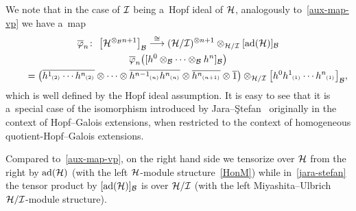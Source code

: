 \documentclass[pdftex]{sigma}
\numberwithin{equation}{section}
\DeclareMathOperator{\ad}{ad}
\newcommand{\ps}[1]{~\hspace{-4pt}_{^{(#1)}}}
\newcommand{\wbar}[1]{\overline{#1}}
\begin{document}
We note that in the case of ${\cal I}$ being a~Hopf ideal of ${\cal H}$, analogously to~\eqref{aux-map-vp} we have a~map
\begin{gather}
\label{jara-stefan}
\overline{\varphi}_n\colon \ \big[{\cal H}^{\otimes_{\cal B} n+1}\big]_{{\cal B}} \stackrel{\cong}{\longrightarrow} ({\cal
H}/{\cal I})^{\otimes n+1} \otimes_{{\cal H}/{\cal I}} [\ad({\cal H})]_{{\cal B}}
\\
\overline{\varphi}_n\big([h^0\otimes_{\cal B}\cdots\otimes_{\cal B} h^n]_{\cal B} \big)\nonumber
\\
\qquad
=\big(\wbar{h^1\ps{2}\cdots h^n\ps{2}} \otimes\cdots\otimes \wbar{h^{n-1}\ps{n}h^n\ps{n}} \otimes
\wbar{h^n\ps{n+1}} \otimes \wbar{1}\big) \otimes_{{\cal H}/{\cal I}} \big[h^0h^1\ps{1}\cdots h^n\ps{1}\big]_{{\cal B}},\nonumber
\end{gather}
which is well def\/ined by the Hopf ideal assumption.
It is easy to see that it is a~special case of the isomorphism introduced by Jara--\c{S}tefan~\cite[Theorem~3.7]{JaraStef06}
originally in the context of Hopf--Galois extensions, when restricted to the context of homogeneous
quotient-Hopf--Galois extensions.

Compared to~\eqref{aux-map-vp}, on the right hand side we tensorize over ${\cal H}$ from the right by $\ad({\cal H})$
(with the left ${\cal H}$-module structure~\eqref{HonM}) while in~\eqref{jara-stefan}
the tensor product by $[\ad({\cal H})]_{{\cal B}}$ is over ${\cal H}/{\cal I}$ (with the left Miyashita--Ulbrich ${\cal H}/{\cal I}$-module structure).
\end{document}
